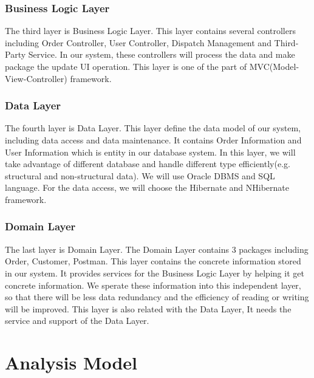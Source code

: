\documentclass[12pt]{scrreprt}
\begin{document}
\subsubsection{Business Logic Layer}
The third layer is Business Logic Layer. This layer contains several
controllers including Order Controller, User Controller, Dispatch Management and
Third-Party Service. In our system, these controllers will process the data and
make package the update UI operation. This layer is one of the part of
MVC(Model-View-Controller) framework.
\subsubsection{Data Layer}
The fourth layer is Data Layer. This layer define the data model of our system,
including data access and data maintenance. It contains Order Information and
User Information which is entity in our database system. In this layer, we will
take advantage of different database and handle different type efficiently(e.g.
structural and non-structural data). We will use Oracle DBMS and SQL language.
For the data access, we will choose the Hibernate and NHibernate framework.
\subsubsection{Domain Layer}
The last layer is Domain Layer. The Domain Layer contains $3$ packages including
Order, Customer, Postman. This layer contains the concrete information stored
in our system. It provides services for the Business Logic Layer by helping it
get concrete information. We sperate these information into this independent
layer, so that there will be less data redundancy and the efficiency of reading
or writing will be improved. This layer is also related with the Data Layer, It
needs the service and support of the Data Layer.
\section{Analysis Model}
\end{document}
